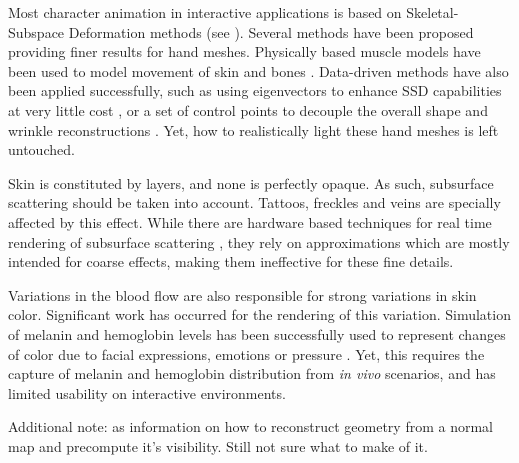 Most character animation in interactive applications is based on Skeletal-Subspace Deformation methods (see \cite{Magnenat-thalmann}). Several methods have been proposed providing finer results for hand meshes. Physically based muscle models have been used to model movement of skin and bones \cite{Fernando:2004:GGP:983868}. Data-driven methods have also been applied successfully, such as using eigenvectors to enhance SSD capabilities at very little cost \cite{Kry:2002:ERT:545261.545286}, or a set of control points to decouple the overall shape and wrinkle reconstructions \cite{Huang:2012:DCD:2311637.2311785}. Yet, how to realistically light these hand meshes is left untouched.

Skin is constituted by layers, and none is perfectly opaque. As such, subsurface scattering should be taken into account. Tattoos, freckles and veins are specially affected by this effect. While there are hardware based techniques for real time rendering of subsurface scattering \cite{Fernando:2004:GGP:983868}, they rely on approximations which are mostly intended for coarse effects, making them ineffective for these fine details.

Variations in the blood flow are also responsible for strong variations in skin color. Signiﬁcant work has occurred for the rendering of this variation. Simulation of melanin and hemoglobin levels has been successfully used to represent changes of color due to facial expressions, emotions \cite{Jimenez:2010:PAM:1882261.1866167} or pressure \cite{Donner:2008:LHR:1409060.1409093}. Yet, this requires the capture of melanin and hemoglobin distribution from \emph{in vivo} scenarios, and has limited usability on interactive environments.


Additional note: \cite{Heidrich:2000:IMG:344779.344984} as information on how to reconstruct geometry from a normal map and precompute it's visibility. Still not sure what to make of it.
